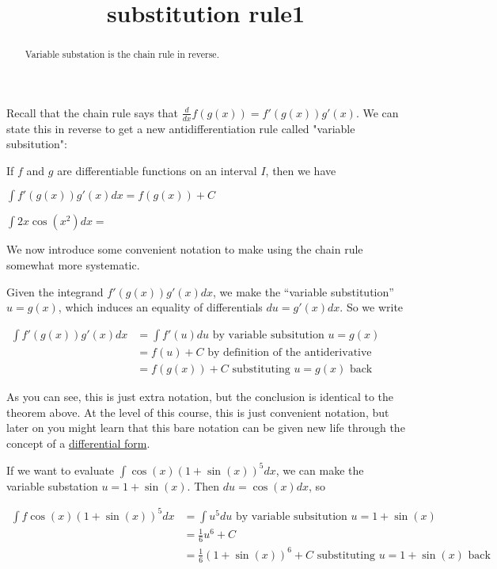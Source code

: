 \documentclass{ximera}
\title{substitution rule1}
\begin{document}
\begin{abstract}
  Variable substation is the chain rule in reverse.
\end{abstract}

\maketitle


Recall that the chain rule says that $\frac{d}{dx} f(g(x)) = f'(g(x))g'(x)$.  We can state this in reverse to get a new antidifferentiation rule called "variable subsitution":

\begin{theorem}
If $f$ and $g$ are differentiable functions on an interval $I$, then we have

$\displaystyle\int f'(g(x))g'(x)dx = f(g(x))+C$
\end{theorem}

\begin{question}
	$\int 2x\cos(x^2) dx=$
\end{question}

We now introduce some convenient notation to make using the chain rule somewhat more systematic.

Given the integrand $f'(g(x))g'(x)dx$, we make the ``variable substitution'' $ u = g(x)$, which induces an equality of differentials $du = g'(x)dx$.  So we write

$\begin{align*}
	\displaystyle \int f'(g(x))g'(x) dx &= \displaystyle \int f'(u) du \text{ by variable subsitution \(u=g(x)\)}\\
	&=f(u)+C \text{ by definition of the antiderivative}\\
	&=f(g(x)) +C \text{ substituting \(u=g(x)\) back}
\end{align*}$

As you can see, this is just extra notation, but the conclusion is identical to the theorem above.  At the level of this course, this is just convenient notation, but later on you might learn that this bare notation can be given new life through the concept of a \href{http://en.wikipedia.org/wiki/Differential_form}{differential form}.

\begin{example}
If we want to evaluate $\displaystyle \int \cos(x)(1+\sin(x))^5 dx$, we can make the variable substation $u = 1+\sin(x)$.  Then $du=\cos(x)dx$, so

$\begin{align*}
	\displaystyle \int f\cos(x)(1+\sin(x))^5 dx &= \displaystyle \int u^5 du \text{ by variable subsitution \(u=1+\sin(x)\)}\\
	&=\frac{1}{6}u^6+C\\
	&=\frac{1}{6}(1+\sin(x))^6 +C \text{ substituting \(u=1+\sin(x)\) back}
\end{align*}$

\end{example}
\end{document}

